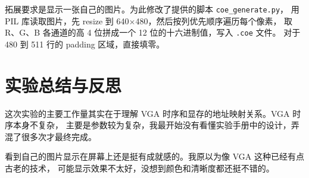 \documentclass[12pt, a4paper]{ctexart}
\begin{document}
拓展要求是显示一张自己的图片。为此修改了提供的脚本 \texttt{coe\_generate.py}，
用 PIL 库读取图片，先 resize 到 640$\times$480，然后按列优先顺序遍历每个像素，
取 R、G、B 各通道的高 4 位拼成一个 12 位的十六进制值，写入 \texttt{.coe} 文件。
对于 480 到 511 行的 padding 区域，直接填零。

\section{实验总结与反思}

这次实验的主要工作量其实在于理解 VGA 时序和显存的地址映射关系。VGA 时序本身不复杂，
主要是参数较为复杂，我最开始没有看懂实验手册中的设计，弄混了很多次才最终完成。

看到自己的图片显示在屏幕上还是挺有成就感的。我原以为像 VGA 这种已经有点古老的技术，
可能显示效果不太好，没想到颜色和清晰度都还挺不错的。
\end{document}

